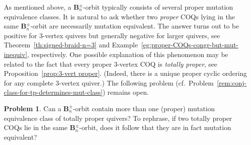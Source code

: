 \documentclass[11pt, letterpaper]{amsart}
\theoremstyle{definition}
\newtheorem{problem}[theorem]{Problem}
\numberwithin{equation}{section}
\begin{document}


As mentioned above, a $\mathbf{B}_n^\pm$-orbit typically consists of several proper mutation equivalence classes. 
It is natural to ask whether two \emph{proper} COQs lying in the same \hbox{$\mathbf{B}_n^\pm$-orbit}
are necessarily mutation equivalent. The answer turns out to be positive for 3-vertex quivers
but generally negative for larger quivers, see Theorem~\ref{th:signed-braid-n=3}
and Example~\ref{eg:proper-COQs-congr-but-mut-inequiv}, respectively. 
One possible explanation of this phenomenon may be related to the fact 
that every proper $3$-vertex COQ is \emph{totally proper}, see Proposition~\ref{prop:3-vert proper}.
(Indeed, there is a unique proper cyclic ordering for any complete $3$-vertex quiver.) 
The following problem (cf.\ Problem~\ref{rem:conj-class-for-tp-determines-mut-class}) remains open. 

\begin{problem}
\label{problem:braid-orbit-totally-proper}
Can a $\mathbf{B}_n^\pm$-orbit contain more than one (proper) mutation equivalence class
of totally proper quivers?
To rephrase, if two totally proper COQs lie in the same $\mathbf{B}_n^\pm$-orbit,
does it follow that they are in fact mutation equivalent? 
\end{problem}

\pagebreak[3]
\end{document}
